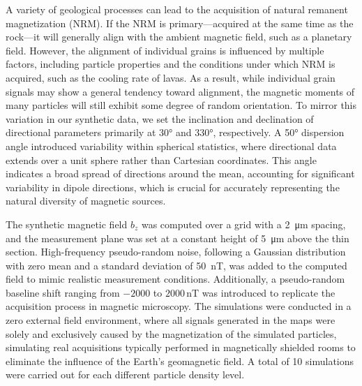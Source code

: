 A variety of geological processes can lead to the acquisition of natural remanent magnetization (NRM). If the NRM is primary—acquired at the same time as the rock—it will generally align with the ambient magnetic field, such as a planetary field. However, the alignment of individual grains is influenced by multiple factors, including particle properties \citep[shape, size, domain state,][]{Bellon2025} and the conditions under which NRM is acquired, such as the cooling rate of lavas. As a result, while individual grain signals may show a general tendency toward alignment, the magnetic moments of many particles will still exhibit some degree of random orientation. To mirror this variation in our synthetic data, we set the inclination and declination of directional parameters primarily at 30° and 330°, respectively. A 50° dispersion angle introduced variability within spherical statistics, where directional data extends over a unit sphere rather than Cartesian coordinates. This angle indicates a broad spread of directions around the mean, accounting for significant variability in dipole directions, which is crucial for accurately representing the natural diversity of magnetic sources.

The synthetic magnetic field \(b_z\) was computed over a grid with a \qty{2}{\um} spacing, and the measurement plane was set at a constant height of \qty{5}{\um} above the thin section. High-frequency pseudo-random noise, following a Gaussian distribution with zero mean and a standard deviation of \qty{50}{\nano\tesla}, was added to the computed field to mimic realistic measurement conditions. Additionally, a pseudo-random baseline shift ranging from \(-2000\) to \(2000\,\mathrm{nT}\) was introduced to replicate the acquisition process in magnetic microscopy. The simulations were conducted in a zero external field environment, where all signals generated in the maps were solely and exclusively caused by the magnetization of the simulated particles, simulating real acquisitions typically performed in magnetically shielded rooms to eliminate the influence of the Earth's geomagnetic field. A total of 10 simulations were carried out for each different particle density level.

